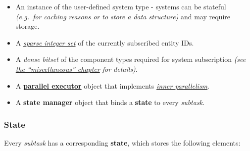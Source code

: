\documentclass[twoside, 12pt, a4paper, openany]{book}
\begin{document}
\begin{itemize}
\item
  An instance of the user-defined system type - systems can be stateful
  \emph{(e.g.~for caching reasons or to store a data structure)} and may
  require storage.
\item
  A \protect\hyperlink{appendix_sparse_integer_sets}{\emph{sparse
  integer set}} of the currently subscribed entity IDs.
\item
  A \emph{dense bitset} of the component types required for system
  subscription \emph{(see
  \protect\hyperlink{appendix_component_bitset_creation}{the
  ``miscellaneous'' chapter} for details)}.
\item
  A \protect\hyperlink{multithreading_par_executor}{\textbf{parallel
  executor}} object that implements
  \protect\hyperlink{multithreading_inner_par}{\emph{inner
  parallelism}}.
\item
  A \textbf{state manager} object that binds a \textbf{state} to every
  \emph{subtask}.
\end{itemize}

\hypertarget{storage_state}{\subsubsection{State}\label{storage_state}}

Every \emph{subtask} has a corresponding \textbf{state}, which stores
the following elements:
\end{document}
